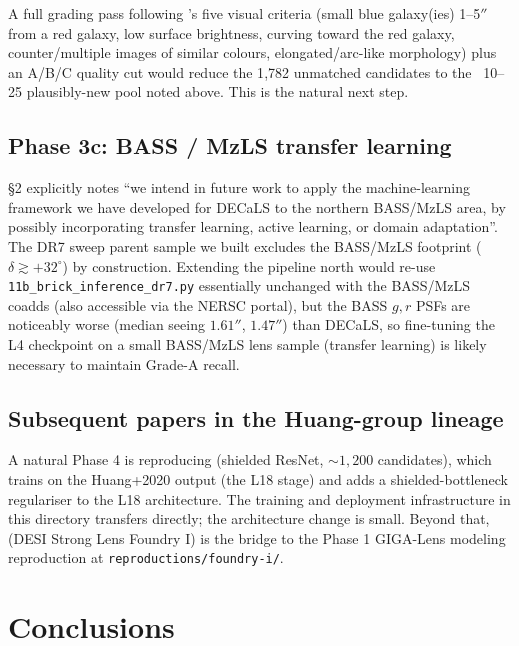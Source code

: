 \documentclass[11pt,letterpaper]{article}
\begin{document}
A full grading pass following \textcite{huang2020decals}'s five visual
criteria (small blue galaxy(ies) 1--5$''$ from a red galaxy, low surface
brightness, curving toward the red galaxy, counter/multiple images of
similar colours, elongated/arc-like morphology) plus an A/B/C
quality cut would reduce the 1{,}782 unmatched candidates to the
~10--25 plausibly-new pool noted above. This is the natural next step.

\subsection{Phase 3c: BASS / MzLS transfer learning}

\textcite{huang2020decals} \S2 explicitly notes ``we intend in future
work to apply the machine-learning framework we have developed for
DECaLS to the northern BASS/MzLS area, by possibly incorporating
transfer learning, active learning, or domain adaptation''. The DR7
sweep parent sample we built excludes the BASS/MzLS footprint
($\delta \gtrsim +32^\circ$) by construction. Extending the pipeline
north would re-use \texttt{11b\_brick\_inference\_dr7.py} essentially
unchanged with the BASS/MzLS coadds (also accessible via the NERSC
portal), but the BASS $g, r$ PSFs are noticeably worse (median seeing
$1.61''$, $1.47''$) than DECaLS, so fine-tuning the L4 checkpoint on
a small BASS/MzLS lens sample (transfer learning) is likely necessary
to maintain Grade-A recall.

\subsection{Subsequent papers in the Huang-group lineage}

A natural Phase 4 is reproducing \textcite{huang2021desi} (shielded
ResNet, $\sim 1{,}200$ candidates), which trains on the Huang+2020
output (the L18 stage) and adds a shielded-bottleneck regulariser to
the L18 architecture. The training and deployment infrastructure in
this directory transfers directly; the architecture change is small.
Beyond that, \textcite{huang2025foundry1} (DESI Strong Lens Foundry I)
is the bridge to the Phase 1 GIGA-Lens modeling reproduction at
\texttt{reproductions/foundry-i/}.

\section{Conclusions}
\end{document}
